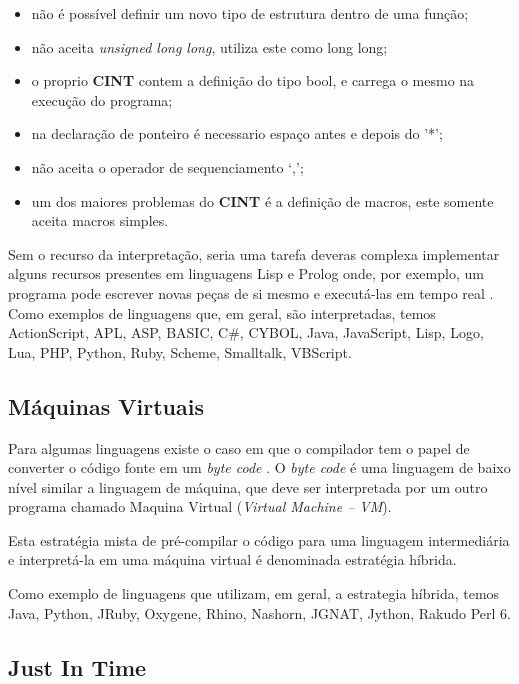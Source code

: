 \begin{itemize}
	\item não é possível definir um novo tipo de estrutura dentro de uma função;
    \item não aceita \textit{unsigned long long}, utiliza este como long long;
    \item o proprio \textbf{CINT} contem a definição do tipo bool, e carrega o mesmo na execução do programa;
    \item na declaração de ponteiro é necessario espaço antes e depois do '*'; 
    \item não aceita o operador de sequenciamento ‘,’; 
    \item um dos maiores problemas do \textbf{CINT} é a definição de macros, este somente aceita macros simples.
\end{itemize}

Sem  o recurso da interpretação, seria uma tarefa deveras complexa implementar 
alguns recursos  presentes em linguagens Lisp e Prolog onde, por exemplo, 
um programa pode escrever novas peças de si mesmo e executá-las em tempo real
 \cite[pág. 17]{ref6}.
Como exemplos de linguagens que, em geral, são interpretadas, temos ActionScript,
 APL, ASP, BASIC, C\#, CYBOL, Java, JavaScript, Lisp, Logo, Lua, PHP, Python, Ruby,
 Scheme, Smalltalk, VBScript.
 

\subsection{Máquinas Virtuais}

Para algumas linguagens existe o caso em que o compilador tem o papel
 de converter o código fonte em um \textit{byte code} \cite[pág. 49]{ref9}. 
O \textit{byte code}
é uma linguagem de baixo nível  similar a linguagem de máquina, que 
deve ser interpretada por um outro programa chamado Maquina Virtual (\textit{Virtual Machine -- VM}).

Esta estratégia mista de pré-compilar o código para uma linguagem 
intermediária e interpretá-la em uma máquina virtual é denominada 
estratégia híbrida. 

Como exemplo de linguagens que utilizam, em geral, a estrategia híbrida, temos 
 Java, Python, JRuby, Oxygene, Rhino, Nashorn, JGNAT, Jython, Rakudo Perl 6.

\subsection{Just In Time}

